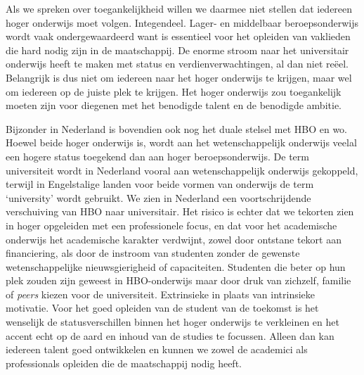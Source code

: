\documentclass[smallauthor, chapterhaspagenum, nochapterinheader, pagenuminheader,  bigchapnum,medium2, tocpages,  garamond, titleinheader]{jote-book}
\begin{document}
	Als we spreken over toegankelijkheid willen we daarmee niet stellen dat iedereen hoger onderwijs moet volgen. Integendeel. Lager- en middelbaar beroepsonderwijs wordt vaak ondergewaardeerd want is essentieel voor het opleiden van vaklieden die hard nodig zijn in de maatschappij. De enorme stroom naar het universitair onderwijs heeft te maken met status en verdienverwachtingen, al dan niet reëel. Belangrijk is dus niet om iedereen naar het hoger onderwijs te krijgen, maar wel om iedereen op de juiste plek te krijgen. Het hoger onderwijs zou toegankelijk moeten zijn voor diegenen met het benodigde talent en de benodigde ambitie.



	Bijzonder in Nederland is bovendien ook nog het duale stelsel met HBO en wo. Hoewel beide hoger onderwijs is, wordt aan het wetenschappelijk onderwijs veelal een hogere status toegekend dan aan hoger beroepsonderwijs. De term universiteit wordt in Nederland vooral aan wetenschappelijk onderwijs gekoppeld, terwijl in Engelstalige landen voor beide vormen van onderwijs de term ‘university' wordt gebruikt. We zien in Nederland een voortschrijdende verschuiving van HBO naar universitair. Het risico is echter dat we tekorten zien in hoger opgeleiden met een professionele focus, en dat voor het academische onderwijs het academische karakter verdwijnt, zowel door ontstane tekort aan financiering, als door de instroom van studenten zonder de gewenste wetenschappelijke nieuwsgierigheid of capaciteiten. Studenten die beter op hun plek zouden zijn geweest in HBO-onderwijs maar door druk van zichzelf, familie of \emph{peers} kiezen voor de universiteit. Extrinsieke in plaats van intrinsieke motivatie. Voor het goed opleiden van de student van de toekomst is het wenselijk de statusverschillen binnen het hoger onderwijs te verkleinen en het accent echt op de aard en inhoud van de studies te focussen. Alleen dan kan iedereen talent goed ontwikkelen en kunnen we zowel de academici als professionals opleiden die de maatschappij nodig heeft.
\end{document}
